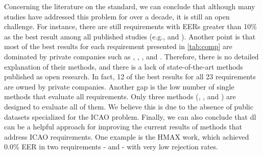 Concerning the literature on the \icao standard, we can conclude that although many studies have addressed this problem for over a decade, it is still an open challenge. For instance, there are still requirements with EERs greater than 10\% as the best result among all published studies (e.g., \lookingaway and \hairacrosseyes). Another point is that most of the best results for each requirement presented in \autoref{tab:comp} are dominated by private companies such as \cite{biometrika}, \cite{id3}, \cite{seamfix}, and \cite{vsoft}. Therefore, there is no detailed explanation of their methods, and there is a lack of state-of-the-art methods published as open research. In fact, 12 of the best results for all 23 requirements are owned by private companies. Another gap is the low number of single methods that evaluate all requirements. Only three methods (\biolab, \biotest, and \biopass) are designed to evaluate all of them. We believe this is due to the absence of public datasets specialized for the ICAO problem. Finally, we can also conclude that \acl{dl} can be a helpful approach for improving the current results of methods that address ICAO requirements. One example is the HMAX work, which achieved 0.0\% EER in two requirements - \framestooheavy and \framecoveringeyes - with very low rejection rates.
 